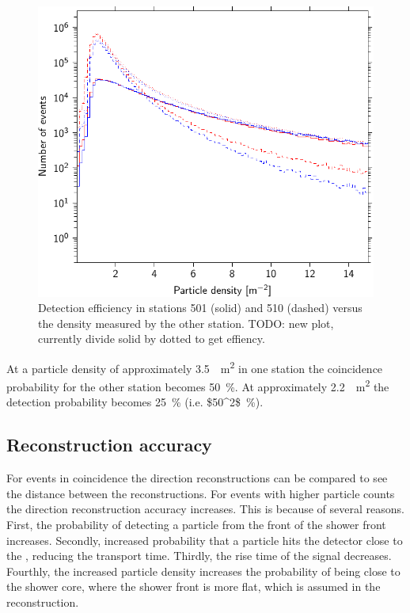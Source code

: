 \begin{figure}
    \centering
    \includegraphics{plots/station/anti_coincidences}
    \caption{Detection efficiency in stations 501 (solid) and 510 (dashed) versus the density measured by the other station. TODO: new plot, currently divide solid by dotted to get effiency.}
    \label{fig:effiency_501_510}
\end{figure}

At a particle density of approximately \SI{3.5}{\per\square\meter} in one station the coincidence probability for the other station becomes \SI{50}{\percent}. At approximately \SI{2.2}{\per\square\meter} the detection probability becomes \SI{25}{\percent} (i.e. \SI{$50^2$}{\percent}).


\subsection{Reconstruction accuracy}

For events in coincidence the direction reconstructions can be compared to see the distance between the reconstructions. For events with higher particle counts the direction reconstruction accuracy increases. This is because of several reasons. First, the probability of detecting a particle from the front of the shower front increases. Secondly, increased probability that a particle hits the detector close to the \pmt, reducing the transport time. Thirdly, the rise time of the signal decreases. Fourthly, the increased particle density increases the probability of being close to the shower core, where the shower front is more flat, which is assumed in the reconstruction.

